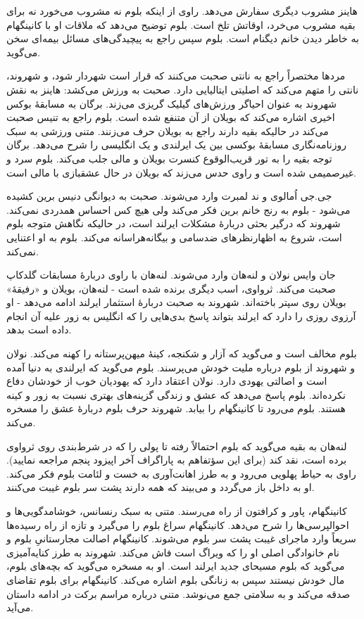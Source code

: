 \documentclass[12pt]{book}
\begin{document}
    هاینز مشروب دیگری سفارش می‌دهد. راوی از اینکه بلوم نه مشروب می‌خورد نه برای بقیه مشروب می‌خرد، اوقاتش تلخ است. بلوم توضیح می‌دهد که ملاقات او با کانینگهام به خاطر دیدن خانم دیگنام است. بلوم سپس راجع به پیچیدگی‌های مسائل بیمه‌ای سخن می‌گوید.

    مردها مختصراً راجع به نانتی صحبت می‌کنند که قرار است شهردار شود، و شهروند، نانتی را متهم می‌کند که اصلیتی ایتالیایی دارد. صحبت به ورزش می‌کشد: هاینز به نقش شهروند به عنوان احیاگر ورزش‌های گیلیک گریزی می‌زند. برگان به مسابقۀ بوکس اخیری اشاره می‌کند که بویلان از آن متنفع شده است. بلوم راجع به تنیس صحبت می‌کند در حالیکه بقیه دارند راجع به بویلان حرف می‌زنند. متنی ورزشی به سبک روزنامه‌نگاری مسابقۀ بوکسی بین یک ایرلندی و یک انگلیسی را شرح می‌دهد. برگان توجه بقیه را به تور قریب‌الوقوع کنسرت بویلان و مالی جلب می‌کند. بلوم سرد و غیرصمیمی شده است و راوی حدس می‌زند که بویلان در حال عشقبازی با مالی است.

    جی.جی اُمالوی و ند لمبرت وارد می‌شوند. صحبت به دیوانگی دنیس برین کشیده می‌شود - بلوم به رنج خانم برین فکر می‌کند ولی هیچ کس احساس همدردی نمی‌کند. شهروند که درگیر بحثی دربارۀ مشکلات ایرلند است، در حالیکه نگاهش متوجه بلوم است، شروع به اظهارنظرهای ضدسامی و بیگانه‌هراسانه می‌کند. بلوم به او اعتنایی نمی‌کند.

    جان وایس نولان و لنه‌هان وارد می‌شوند. لنه‌هان با راوی دربارۀ مسابقات گلدکاپ صحبت می‌کند. ثرواوی، اسب دیگری برنده شده است - لنه‌هان، بویلان و «رفیقۀ» بویلان روی سپتر باخته‌اند. شهروند به صحبت دربارۀ استثمار ایرلند ادامه می‌دهد - او آرزوی روزی را دارد که ایرلند بتواند پاسخ بدی‌هایی را که انگلیس به زور علیه آن انجام داده است بدهد.

    بلوم مخالف است و می‌گوید که آزار و شکنجه، کینۀ میهن‌پرستانه را کهنه می‌کند. نولان و شهروند از بلوم درباره ملیت خودش می‌پرسند. بلوم می‌گوید که ایرلندی به دنیا آمده است و اصالتی یهودی دارد. نولان اعتقاد دارد که یهودیان خوب از خودشان دفاع نکرده‌اند. بلوم پاسخ می‌دهد که عشق و زندگی گزینه‌های بهتری نسبت به زور و کینه هستند. بلوم می‌رود تا کانینگهام را بیابد. شهروند حرف بلوم دربارۀ عشق را مسخره می‌کند.

    لنه‌هان به بقیه می‌گوید که بلوم احتمالاً رفته تا پولی را که در شرط‌بندی روی ثرواوی برده است، نقد کند (برای این سؤتفاهم به پاراگراف آخر اپیزود پنجم مراجعه نمایید). راوی به حیاط پهلویی می‌رود و به طرز اهانت‌آوری به خست و لئامت بلوم فکر می‌کند. او به داخل باز می‌گردد و می‌بیند که همه دارند پشت سر بلوم غیبت می‌کنند.

    کانینگهام، پاور و کرافتون از راه می‌رسند. متنی به سبک رنسانس، خوشامدگویی‌ها و احوالپرسی‌ها را شرح می‌دهد. کانینگهام سراغ بلوم را می‌گیرد و تازه از راه رسیده‌ها سریعاً وارد ماجرای غیبت پشت سر بلوم می‌شوند. کانینگهام اصالت مجارستانیِ بلوم و نام خانوادگی اصلی او را که ویراگ است فاش می‌کند. شهروند به طرز کنایه‌آمیزی می‌گوید که بلوم مسیحای جدید ایرلند است. او به مسخره می‌گوید که بچه‌های بلوم، مال خودش نیستند سپس به زنانگی بلوم اشاره می‌کند. کانینگهام برای بلوم تقاضای صدقه می‌کند و به سلامتی جمع می‌نوشد. متنی درباره مراسم برکت در ادامه داستان می‌آید.
\end{document}
